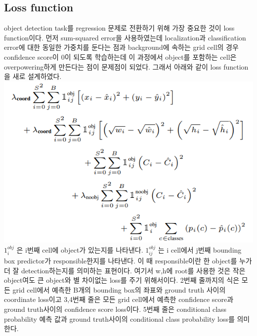 \documentclass[extendedabs]{bmvc2k}
\begin{document}
\subsection{Loss function}
\quad object detection task를 regression 문제로 전환하기 위해 가장 중요한 것이 loss function이다. 먼저 sum-squared error을 사용하였는데
localization과 classification error에 대한 동일한 가중치를 둔다는 점과 background에 속하는 grid cell의 경우 confidence score이 0이 되도록 학습하는데 
이 과정에서 object를 포함하는 cell은 overpowering하게 만든다는 점이 문제점이 되었다. 그래서 아래와 같이 loss function을 새로 설계하였다.
\newline  \includegraphics[width=\linewidth]{images/03_YOLO.PNG}
$1^{obj}_i$ 은 i번째 cell에 object가 있는지를 나타낸다. 
$1^{obj}_{ij}$ 는 i cell에서 j번째 bounding box predictor가 responsible한지를 나타낸다.
이 때 responsible이란 한 object를 누가 더 잘 detection하는지를 의미하는 표현이다.
여기서 w,h에 root를 사용한 것은 작은 object여도 큰 object와 별 차이없는 loss를 주기 위해서이다. 
2번째 줄까지의 식은 모든 grid cell에서 예측한 B개의 bounding box의 좌표와 ground truth 사이의 coordinate loss이고
3,4번째 줄은 모든 grid cell에서 예측한 confidence score과 ground truth사이의 confidence score loss이다.
5번째 줄은 conditional class probability 예측 값과 ground truth사이의 conditional class probability loss를 의미한다.
\end{document}
